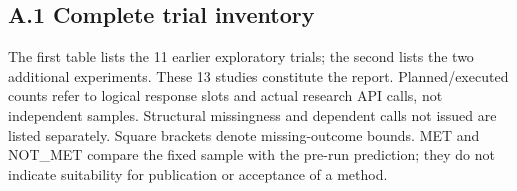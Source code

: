 \documentclass[10pt,a4paper]{article}
\newlength{\usable}
\begin{document}
\subsection{A.1 Complete trial inventory}\label{paper-01-a.1-complete-trial-inventory}

The first table lists the 11 earlier exploratory trials; the second lists the two additional experiments. These 13 studies constitute the report. Planned/executed counts refer to logical response slots and actual research API calls, not independent samples. Structural missingness and dependent calls not issued are listed separately. Square brackets denote missing-outcome bounds. MET and NOT\_MET compare the fixed sample with the pre-run prediction; they do not indicate suitability for publication or acceptance of a method.

\Needspace{115pt}
\begingroup\fontsize{9.1}{12}\selectfont\setlength{\parskip}{1pt}
\setlength{\usable}{\dimexpr\linewidth-10\tabcolsep\relax}
\end{document}

